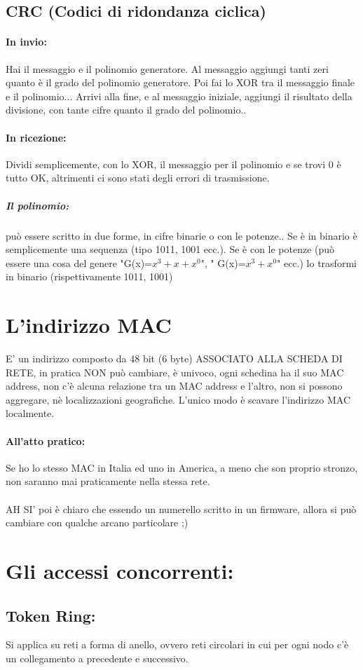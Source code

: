\documentclass[12pt, a4paper, openany, twoside]{book}
\begin{document}
\subsection{CRC (Codici di ridondanza ciclica)}
\paragraph{In invio: }
Hai il messaggio e il polinomio generatore. Al messaggio aggiungi tanti zeri 
quanto è il grado del polinomio generatore. Poi fai lo XOR tra il messaggio 
finale e il polinomio... Arrivi alla fine, e al messaggio iniziale, aggiungi 
il risultato della divisione, con tante cifre quanto il grado del polinomio..
\paragraph{In ricezione: }
Dividi semplicemente, con lo XOR, il messaggio per il polinomio e se trovi 0 è 
tutto OK, altrimenti ci sono stati degli errori di trasmissione.
\subparagraph{Il polinomio: } può essere scritto in due forme, 
in cifre binarie o con le potenze.. Se è in binario è semplicemente una sequenza
(tipo 1011, 1001 ecc.). Se è con le potenze (può essere una cosa del genere
"G(x)=$x^{3}+x+x^{0}$", " G(x)=$x^{3}+x^{0}$" ecc.) lo trasformi in binario 
(rispettivamente 1011, 1001)	
\section{L'indirizzo MAC}
E' un indirizzo composto da 48 bit (6 byte) ASSOCIATO ALLA SCHEDA DI RETE, in 
pratica NON può cambiare, è univoco, ogni schedina ha il suo MAC address, non 
c'è alcuna relazione tra un MAC address e l'altro, non si possono aggregare, nè
localizzazioni geografiche. L'unico modo è scavare l'indirizzo MAC localmente.
\paragraph{All'atto pratico: }Se ho lo stesso MAC in Italia ed uno in America,
a meno che son proprio stronzo, non saranno mai praticamente nella stessa rete.\\
\\AH SI' poi è chiaro che essendo un numerello scritto in un firmware, allora si
può cambiare con qualche arcano particolare ;) 
\section{Gli accessi concorrenti: }
\subsection{Token Ring: }
Si applica su reti a forma di anello, ovvero reti circolari in cui per ogni
nodo c'è un collegamento a precedente e successivo. 
\end{document}
